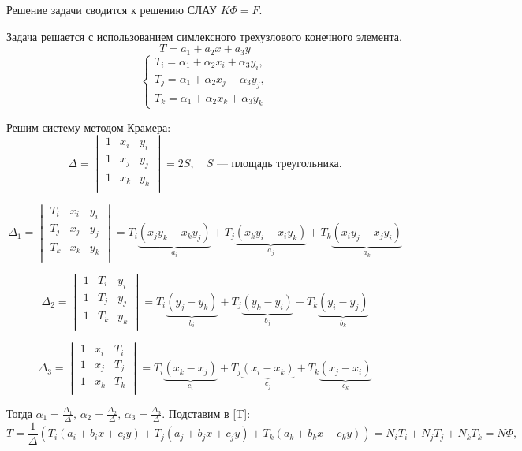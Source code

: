\documentclass[a4paper, 12pt]{article}
\begin{document}
\begin{enumerate}
Решение задачи сводится к решению СЛАУ \( K \Phi = F \).

Задача решается с использованием симлексного трехузлового конечного элемента.
\begin{equation}\label{T}
T = a_1 + a_2 x + a_3 y
\end{equation}
\[
\begin{cases}
T_i = \alpha_1 + \alpha_2 x_i + \alpha_3 y_i, \\
T_j = \alpha_1 + \alpha_2 x_j + \alpha_3 y_j, \\
T_k = \alpha_1 + \alpha_2 x_k + \alpha_3 y_k 
\end{cases}
\]

Решим систему методом Крамера:
\[
\Delta = 
\begin{vmatrix}
1 & x_i & y_i \\
1 & x_j & y_j \\
1 & x_k & y_k \\
\end{vmatrix}
= 2S, \quad S \text{ — площадь треугольника.}
\]

\[
\Delta_1 = 
\begin{vmatrix}
T_i & x_i & y_i \\
T_j & x_j & y_j \\
T_k & x_k & y_k \\
\end{vmatrix}
= T_i \underbrace{(x_j y_k - x_k y_j)}_{a_i} + T_j \underbrace{(x_k y_i - x_i y_k)}_{a_j} + T_k \underbrace{(x_i y_j - x_j y_i)}_{a_k}
\]

\[
\Delta_2 = 
\begin{vmatrix}
1 & T_i & y_i \\
1 & T_j & y_j \\
1 & T_k & y_k \\
\end{vmatrix}
= T_i \underbrace{(y_j - y_k)}_{b_i} + T_j \underbrace{(y_k - y_i)}_{b_j} + T_k \underbrace{(y_i - y_j)}_{b_k}
\]

\[
\Delta_3 = 
\begin{vmatrix}
1 & x_i & T_i \\
1 & x_j & T_j \\
1 & x_k & T_k \\
\end{vmatrix}
= T_i \underbrace{(x_k - x_j)}_{c_i} + T_j \underbrace{(x_i - x_k)}_{c_j} + T_k \underbrace{(x_j - x_i)}_{c_k}
\]

Тогда \(\displaystyle \alpha_1 = \frac{\Delta_1}{\Delta}, \, \alpha_2 = \frac{\Delta_2}{\Delta}, \, \alpha_3 = \frac{\Delta_3}{\Delta} \). Подставим в \eqref{T}:
\[
T = \frac{1}{\Delta} \left( T_i (a_i + b_i x + c_i y) + T_j (a_j + b_j x + c_j y) + T_k (a_k + b_k x + c_k y) \right) 
= N_i T_i + N_j T_j + N_k T_k = N \Phi,
\]


\end{enumerate}
\end{document}

